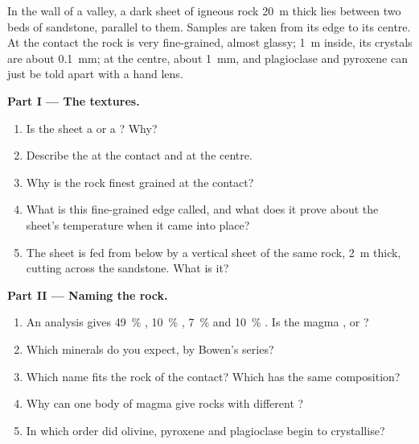 \begin{problem}
\label{pb:g11:igneous-rocks:1}
In the wall of a valley, a dark sheet of igneous rock \qty{20}{m} thick
lies between two beds of sandstone, parallel to them. Samples are taken from
its edge to its centre. At the contact the rock is very fine-grained, almost
glassy; \qty{1}{m} inside, its crystals are about \qty{0.1}{mm}; at the
centre, about \qty{1}{mm}, and plagioclase and pyroxene can just be told
apart with a hand lens.

\medskip
\noindent\textbf{Part I --- The textures.}
\begin{enumerate}
  \item Is the sheet a  or a ? Why?
  \item Describe the  at the contact and at the centre.
  \item Why is the rock finest grained at the contact?
  \item What is this fine-grained edge called, and what does it prove about
        the sheet's temperature when it came into place?
  \item The sheet is fed from below by a vertical sheet of the same rock,
        \qty{2}{m} thick, cutting across the sandstone. What is it?
\end{enumerate}

\medskip
\noindent\textbf{Part II --- Naming the rock.}
\begin{enumerate}[resume]
  \item An analysis gives \qty{49}{\percent} , \qty{10}{\percent}
        , \qty{7}{\percent}  and \qty{10}{\percent}
        . Is the magma ,  or ?
  \item Which minerals do you expect, by Bowen's series?
  \item Which name fits the rock of the contact? Which  has the
        same composition?
  \item Why can one body of magma give rocks with different ?
  \item In which order did olivine, pyroxene and plagioclase begin to
        crystallise?
\end{enumerate}


\end{problem}

